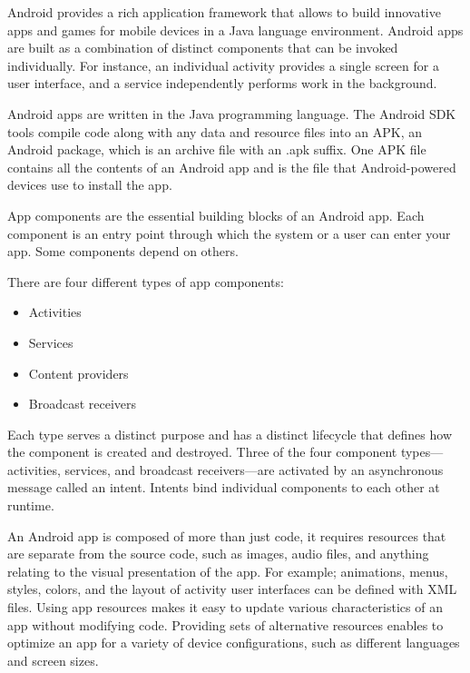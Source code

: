 Android provides a rich application framework that allows to build innovative apps and games for mobile devices in a Java language environment. Android apps are built as a combination of distinct components that can be invoked individually. For instance, an individual activity provides a single screen for a user interface, and a service independently performs work in the background.

Android apps are written in the Java programming language. The Android SDK tools compile code along with any data and resource files into an APK, an Android package, which is an archive file with an .apk suffix. One APK file contains all the contents of an Android app and is the file that Android-powered devices use to install the app.

App components are the essential building blocks of an Android app. Each component is an entry point through which the system or a user can enter your app. Some components depend on others.

There are four different types of app components:
\begin{itemize}
\item Activities
\item Services
\item Content providers
\item Broadcast receivers
\end{itemize}

Each type serves a distinct purpose and has a distinct lifecycle that defines how the component is created and destroyed. Three of the four component types—activities, services, and broadcast receivers—are activated by an asynchronous message called an intent. Intents bind individual components to each other at runtime. 

An Android app is composed of more than just code, it requires resources that are separate from the source code, such as images, audio files, and anything relating to the visual presentation of the app. For example; animations, menus, styles, colors, and the layout of activity user interfaces can be defined with XML files. Using app resources makes it easy to update various characteristics of an app without modifying code. Providing sets of alternative resources enables to optimize an app for a variety of device configurations, such as different languages and screen sizes. \cite{android-developer}


